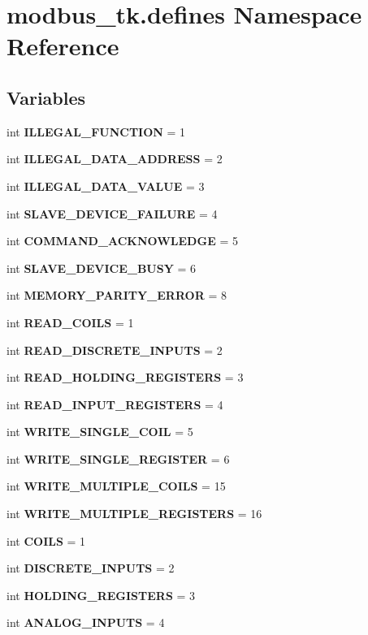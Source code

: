\section{modbus\+\_\+tk.\+defines Namespace Reference}
\label{namespacemodbus__tk_1_1defines}
\subsection*{Variables}
\begin{DoxyCompactItemize}
\item 
int {\bf I\+L\+L\+E\+G\+A\+L\+\_\+\+F\+U\+N\+C\+T\+I\+O\+N} = 1
\item 
int {\bf I\+L\+L\+E\+G\+A\+L\+\_\+\+D\+A\+T\+A\+\_\+\+A\+D\+D\+R\+E\+S\+S} = 2
\item 
int {\bf I\+L\+L\+E\+G\+A\+L\+\_\+\+D\+A\+T\+A\+\_\+\+V\+A\+L\+U\+E} = 3
\item 
int {\bf S\+L\+A\+V\+E\+\_\+\+D\+E\+V\+I\+C\+E\+\_\+\+F\+A\+I\+L\+U\+R\+E} = 4
\item 
int {\bf C\+O\+M\+M\+A\+N\+D\+\_\+\+A\+C\+K\+N\+O\+W\+L\+E\+D\+G\+E} = 5
\item 
int {\bf S\+L\+A\+V\+E\+\_\+\+D\+E\+V\+I\+C\+E\+\_\+\+B\+U\+S\+Y} = 6
\item 
int {\bf M\+E\+M\+O\+R\+Y\+\_\+\+P\+A\+R\+I\+T\+Y\+\_\+\+E\+R\+R\+O\+R} = 8
\item 
int {\bf R\+E\+A\+D\+\_\+\+C\+O\+I\+L\+S} = 1
\item 
int {\bf R\+E\+A\+D\+\_\+\+D\+I\+S\+C\+R\+E\+T\+E\+\_\+\+I\+N\+P\+U\+T\+S} = 2
\item 
int {\bf R\+E\+A\+D\+\_\+\+H\+O\+L\+D\+I\+N\+G\+\_\+\+R\+E\+G\+I\+S\+T\+E\+R\+S} = 3
\item 
int {\bf R\+E\+A\+D\+\_\+\+I\+N\+P\+U\+T\+\_\+\+R\+E\+G\+I\+S\+T\+E\+R\+S} = 4
\item 
int {\bf W\+R\+I\+T\+E\+\_\+\+S\+I\+N\+G\+L\+E\+\_\+\+C\+O\+I\+L} = 5
\item 
int {\bf W\+R\+I\+T\+E\+\_\+\+S\+I\+N\+G\+L\+E\+\_\+\+R\+E\+G\+I\+S\+T\+E\+R} = 6
\item 
int {\bf W\+R\+I\+T\+E\+\_\+\+M\+U\+L\+T\+I\+P\+L\+E\+\_\+\+C\+O\+I\+L\+S} = 15
\item 
int {\bf W\+R\+I\+T\+E\+\_\+\+M\+U\+L\+T\+I\+P\+L\+E\+\_\+\+R\+E\+G\+I\+S\+T\+E\+R\+S} = 16
\item 
int {\bf C\+O\+I\+L\+S} = 1
\item 
int {\bf D\+I\+S\+C\+R\+E\+T\+E\+\_\+\+I\+N\+P\+U\+T\+S} = 2
\item 
int {\bf H\+O\+L\+D\+I\+N\+G\+\_\+\+R\+E\+G\+I\+S\+T\+E\+R\+S} = 3
\item 
int {\bf A\+N\+A\+L\+O\+G\+\_\+\+I\+N\+P\+U\+T\+S} = 4
\end{DoxyCompactItemize}


